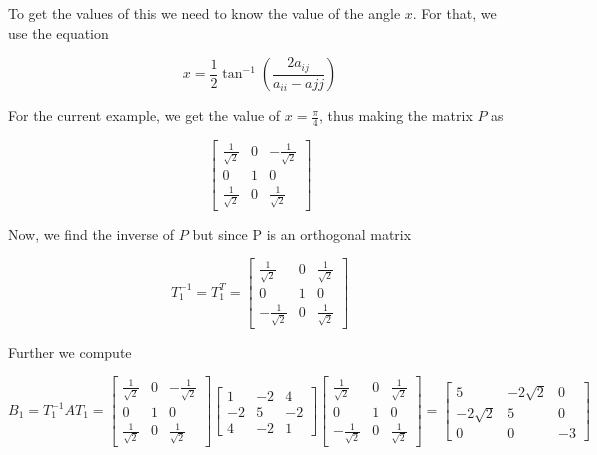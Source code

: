 \documentclass{article}
\begin{document}
To get the values of this we need to know the value of the angle $x$. For that, we use the equation

\[
    x = \frac{1}{2}\tan^{-1}(\frac{2a_{ij}}{a_{ii} - a{jj}})  
\]

For the current example, we get the value of $x = \frac{\pi}{4}$, thus making the matrix $P$ as

\[
    \begin{bmatrix}
        \frac{1}{\sqrt{2}} & 0 & -\frac{1}{\sqrt{2}}   \\
        0 & 1 & 0 \\
        \frac{1}{\sqrt{2}} & 0 & \frac{1}{\sqrt{2}}
    \end{bmatrix}
\]

Now, we find the inverse of $P$ but since P is an orthogonal matrix

\[
    T_{1}^{-1} = T_{1}^{T} = 
    \begin{bmatrix}
        \frac{1}{\sqrt{2}} & 0 & \frac{1}{\sqrt{2}}   \\
        0 & 1 & 0 \\
        -\frac{1}{\sqrt{2}} & 0 & \frac{1}{\sqrt{2}}
    \end{bmatrix}
\]

Further we compute

\[
    B_{1} = T_{1}^{-1}AT_{1} = 
    \begin{bmatrix}
        \frac{1}{\sqrt{2}} & 0 & -\frac{1}{\sqrt{2}}   \\
        0 & 1 & 0 \\
        \frac{1}{\sqrt{2}} & 0 & \frac{1}{\sqrt{2}}
    \end{bmatrix}
    \begin{bmatrix}
        1 & -2 & 4 \\
        -2 & 5 & -2 \\
        4 & -2 & 1
    \end{bmatrix}  
    \begin{bmatrix}
        \frac{1}{\sqrt{2}} & 0 & \frac{1}{\sqrt{2}}   \\
        0 & 1 & 0 \\
        -\frac{1}{\sqrt{2}} & 0 & \frac{1}{\sqrt{2}}  
    \end{bmatrix}
    =
    \begin{bmatrix}
        5 & -2\sqrt{2} & 0 \\
        -2\sqrt{2} & 5 & 0 \\
        0 & 0 & -3 
    \end{bmatrix}
\]
\end{document}
